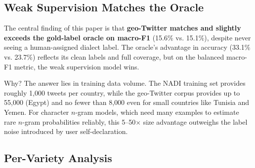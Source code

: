 \documentclass[11pt]{article}
\begin{document}
\subsection{Weak Supervision Matches the Oracle}
\label{sec:weak-vs-oracle}

The central finding of this paper is that \textbf{geo-Twitter matches and
slightly exceeds the gold-label oracle on macro-F1} (15.6\% vs. 15.1\%),
despite never seeing a human-assigned dialect label.  The oracle's advantage
in accuracy (33.1\% vs. 23.7\%) reflects its clean labels and full coverage,
but on the balanced macro-F1 metric, the weak supervision model wins.

Why? The answer lies in training data volume.  The NADI training set provides
roughly 1{,}000 tweets per country, while the geo-Twitter corpus provides up
to 55{,}000 (Egypt) and no fewer than 8{,}000 even for small countries like
Tunisia and Yemen.  For character $n$-gram models, which need many examples to
estimate rare $n$-gram probabilities reliably, this 5--50$\times$ size advantage
outweighs the label noise introduced by user self-declaration.

\subsection{Per-Variety Analysis}
\label{sec:per-variety}
\end{document}
